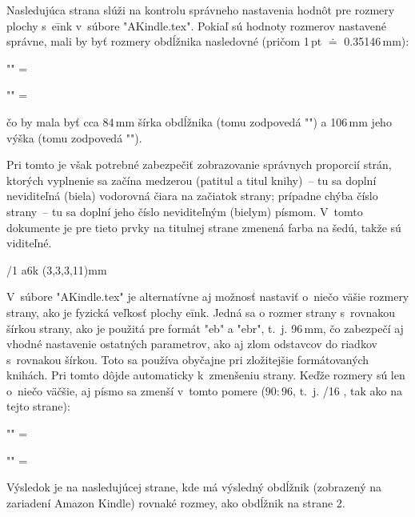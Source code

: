 \def\nopagenumbers{\footline={\localcolor\Grey\hss\tenrm\folio\hss}}
\def\KindleHR{{\localcolor\LightGrey\hrule}}


\TitulStrana

 \PageNumbers %

\seccc \Titul

Nasledujúca strana slúži na kontrolu správneho nastavenia hodnôt pre rozmery
plochy s~e\=ink v~súbore "AKindle.tex". Pokiaľ sú hodnoty rozmerov nastavené
správne,  mali by byť  rozmery obdĺžnika nasledovné  (pričom  1\,pt $\doteq$
0.35146\,mm):

"\hsize" = \the\hsize\par
"\vsize" = \the\vsize\par

\noindent
čo by  mala byť  cca 84\,mm  šírka  obdĺžnika  (tomu  zodpovedá  "\hsize") a
106\,mm jeho výška (tomu zodpovedá "\vsize").

Pri tomto je  však  potrebné  zabezpečiť  zobrazovanie  správnych  proporcií
strán, ktorých vyplnenie sa začína medzerou (patitul a titul knihy)~-- tu sa
doplní neviditeľná (biela) vodorovná  čiara  na  začiatok  strany;  prípadne
chýba číslo strany~-- tu sa doplní jeho číslo neviditeľným (bielym)  písmom.
V~tomto dokumente je pre tieto prvky na titulnej  strane  zmenená  farba  na
šedú, takže sú viditeľné.
\NewPage

\NewPage

\margins/1 a6k (3,3,3,11)mm %

V~súbore "AKindle.tex" je alternatívne aj  možnosť  nastaviť  o~niečo  väšie
rozmery strany, ako je fyzická veľkosť plochy  e\=ink.  Jedná  sa  o  rozmer
strany s~rovnakou šírkou strany, ako je použitá pre  formát  "eb"  a  "ebr",
t.~j. 96\,mm, čo zabezpečí aj vhodné nastavenie ostatných parametrov, ako aj
zlom odstavcov do riadkov s~rovnakou šírkou. Toto sa  používa  obyčajne  pri
zložitejšie formátovaných knihách. Pri tomto dôjde  automaticky  k~zmenšeniu
strany. Keďže rozmery sú len o~niečo väčšie,  aj  písmo  sa  zmenší  v~tomto
pomere ($90:96$, t.~j. /16 , tak ako na tejto strane):

"\hsize" = \the\hsize\par
"\vsize" = \the\vsize\par

\noindent
Výsledok je na nasledujúcej strane,  kde má výsledný obdĺžnik  (zobrazený na
zariadení Amazon Kindle) rovnaké rozmey, ako obdĺžnik na strane 2.
\NewPage


\bye

